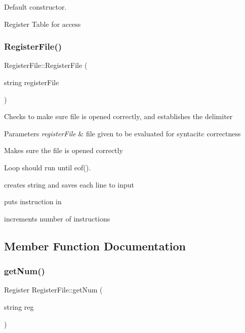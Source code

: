 Default constructor. 

Register Table for access \mbox{\label{class_register_file_a9085db6aaabf8e55819d8bbd73f521b4}} 
\subsubsection{\texorpdfstring{Register\+File()}{RegisterFile()}\hspace{0.1cm}{\footnotesize\ttfamily [2/2]}}
{\footnotesize\ttfamily Register\+File\+::\+Register\+File (\begin{DoxyParamCaption}\item[{string}]{register\+File }\end{DoxyParamCaption})}

Checks to make sure file is opened correctly, and establishes the delimiter 
\begin{DoxyParams}{Parameters}
{\em register\+File} & file given to be evaluated for syntacitc correctness \\
\hline
\end{DoxyParams}
Makes sure the file is opened correctly

Loop should run until eof().

creates string and saves each line to input

puts instruction in

increments number of instructions 

\subsection{Member Function Documentation}
\mbox{\label{class_register_file_a54d87ad82368cfa1dfb8b3f01a3d2e5a}} 
\subsubsection{\texorpdfstring{get\+Num()}{getNum()}}
{\footnotesize\ttfamily Register Register\+File\+::get\+Num (\begin{DoxyParamCaption}\item[{string}]{reg }\end{DoxyParamCaption})}


